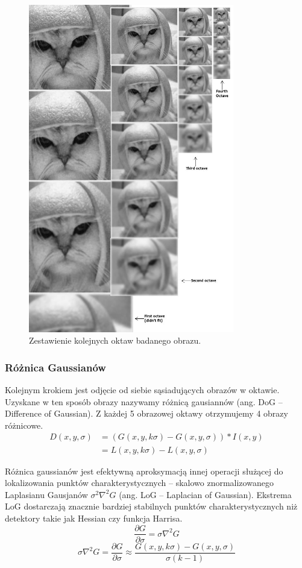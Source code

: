 \begin{figure}[!htb]
\centering
\includegraphics[width=0.8\textwidth]{pict/02/sift/sift_ais_octave.jpg}
\caption{Zestawienie kolejnych oktaw badanego obrazu.}
\label{fig:sift_ais_octave}
\end{figure}

\subsubsection{Różnica Gaussianów}
Kolejnym krokiem jest odjęcie od siebie sąsiadujących obrazów w oktawie. Uzyskane w ten sposób obrazy nazywamy różnicą gausiannów (ang. DoG – Difference  of Gaussian). Z każdej 5 obrazowej oktawy otrzymujemy 4 obrazy różnicowe.
\begin{align}
D(x,y,\sigma) &= (G(x,y,k\sigma)-G(x,y,\sigma))*I(x,y)\\
&= L(x,y,k\sigma) - L(x,y,\sigma)
\end{align}

Różnica gaussianów jest efektywną aproksymacją innej operacji służącej do lokalizowania punktów charakterystycznych – skalowo znormalizowanego Laplasianu Gausjanów $\sigma^2\nabla^2G$ (ang. LoG – Laplacian of Gaussian). Ekstrema LoG dostarczają znacznie bardziej stabilnych punktów charakterystycznych niż detektory takie jak Hessian czy funkcja Harrisa.
\begin{equation}
\frac{\partial G}{\partial \sigma}  = \sigma {\nabla}^2 G
\end{equation}
\begin{equation}
\sigma {\nabla}^2 G = \frac{\partial G}{\partial \sigma} \approx \frac{G(x,y,k\sigma)-G(x,y,\sigma)}{\sigma(k-1)}
\end{equation}

